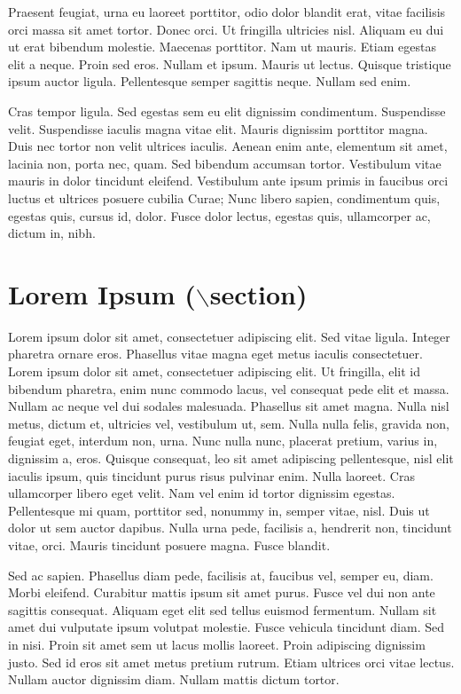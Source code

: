 \documentclass[colorbacktitle,accentcolor=tud9c]{tudposter}
\begin{document}
\begin{multicols}{3}
    Praesent feugiat, urna eu laoreet porttitor, odio dolor blandit erat, vitae facilisis orci massa sit amet tortor. Donec orci. Ut fringilla ultricies nisl. Aliquam eu dui ut erat bibendum molestie. Maecenas porttitor. Nam ut mauris. Etiam egestas elit a neque. Proin sed eros. Nullam et ipsum. Mauris ut lectus. Quisque tristique ipsum auctor ligula. Pellentesque semper sagittis neque. Nullam sed enim.%

    Cras tempor ligula. Sed egestas sem eu elit dignissim condimentum. Suspendisse velit. Suspendisse iaculis magna vitae elit. Mauris dignissim porttitor magna. Duis nec tortor non velit ultrices iaculis. Aenean enim ante, elementum sit amet, lacinia non, porta nec, quam. Sed bibendum accumsan tortor. Vestibulum vitae mauris in dolor tincidunt eleifend. Vestibulum ante ipsum primis in faucibus orci luctus et ultrices posuere cubilia Curae; Nunc libero sapien, condimentum quis, egestas quis, cursus id, dolor. Fusce dolor lectus, egestas quis, ullamcorper ac, dictum in, nibh.%

    \section*{Lorem Ipsum ($\backslash$section)}
    Lorem ipsum dolor sit amet, consectetuer adipiscing elit. Sed vitae ligula. Integer pharetra ornare eros. Phasellus vitae magna eget metus iaculis consectetuer. Lorem ipsum dolor sit amet, consectetuer adipiscing elit. Ut fringilla, elit id bibendum pharetra, enim nunc commodo lacus, vel consequat pede elit et massa. Nullam ac neque vel dui sodales malesuada. Phasellus sit amet magna. Nulla nisl metus, dictum et, ultricies vel, vestibulum ut, sem. Nulla nulla felis, gravida non, feugiat eget, interdum non, urna. Nunc nulla nunc, placerat pretium, varius in, dignissim a, eros. Quisque consequat, leo sit amet adipiscing pellentesque, nisl elit iaculis ipsum, quis tincidunt purus risus pulvinar enim. Nulla laoreet. Cras ullamcorper libero eget velit. Nam vel enim id tortor dignissim egestas. Pellentesque mi quam, porttitor sed, nonummy in, semper vitae, nisl. Duis ut dolor ut sem auctor dapibus. Nulla urna pede, facilisis a, hendrerit non, tincidunt vitae, orci. Mauris tincidunt posuere magna. Fusce blandit.%

    Sed ac sapien. Phasellus diam pede, facilisis at, faucibus vel, semper eu, diam. Morbi eleifend. Curabitur mattis ipsum sit amet purus. Fusce vel dui non ante sagittis consequat. Aliquam eget elit sed tellus euismod fermentum. Nullam sit amet dui vulputate ipsum volutpat molestie. Fusce vehicula tincidunt diam. Sed in nisi. Proin sit amet sem ut lacus mollis laoreet. Proin adipiscing dignissim justo. Sed id eros sit amet metus pretium rutrum. Etiam ultrices orci vitae lectus. Nullam auctor dignissim diam. Nullam mattis dictum tortor.
    

\end{multicols}
\end{document}
